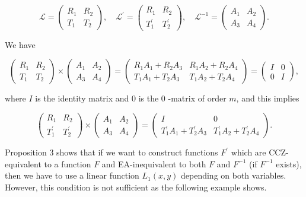 \documentclass[10pt]{article}
\begin{document}
$$
\mathcal{L}=\left(\begin{array}{ll}
R_{1} & R_{2} \\
T_{1} & T_{2}
\end{array}\right), \quad \mathcal{L}^{\prime}=\left(\begin{array}{ll}
R_{1} & R_{2} \\
T_{1}^{\prime} & T_{2}^{\prime}
\end{array}\right), \quad \mathcal{L}^{-1}=\left(\begin{array}{ll}
A_{1} & A_{2} \\
A_{3} & A_{4}
\end{array}\right) .
$$

We have

$$
\left(\begin{array}{ll}
R_{1} & R_{2} \\
T_{1} & T_{2}
\end{array}\right) \times\left(\begin{array}{ll}
A_{1} & A_{2} \\
A_{3} & A_{4}
\end{array}\right)=\left(\begin{array}{ll}
R_{1} A_{1}+R_{2} A_{3} & R_{1} A_{2}+R_{2} A_{4} \\
T_{1} A_{1}+T_{2} A_{3} & T_{1} A_{2}+T_{2} A_{4}
\end{array}\right)=\left(\begin{array}{ll}
I & 0 \\
0 & I
\end{array}\right),
$$

where $I$ is the identity matrix and 0 is the 0 -matrix of order $m$, and this implies

$$
\left(\begin{array}{ll}
R_{1} & R_{2} \\
T_{1}^{\prime} & T_{2}^{\prime}
\end{array}\right) \times\left(\begin{array}{ll}
A_{1} & A_{2} \\
A_{3} & A_{4}
\end{array}\right)=\left(\begin{array}{cc}
I & 0 \\
T_{1}^{\prime} A_{1}+T_{2}^{\prime} A_{3} & T_{1}^{\prime} A_{2}+T_{2}^{\prime} A_{4}
\end{array}\right) .
$$

Proposition 3 shows that if we want to construct functions $F^{\prime}$ which are CCZ-equivalent to a function $F$ and EA-inequivalent to both $F$ and $F^{-1}$ (if $F^{-1}$ exists), then we have to use a linear function $L_{1}(x, y)$ depending on both variables. However, this condition is not sufficient as the following example shows.
\end{document}
